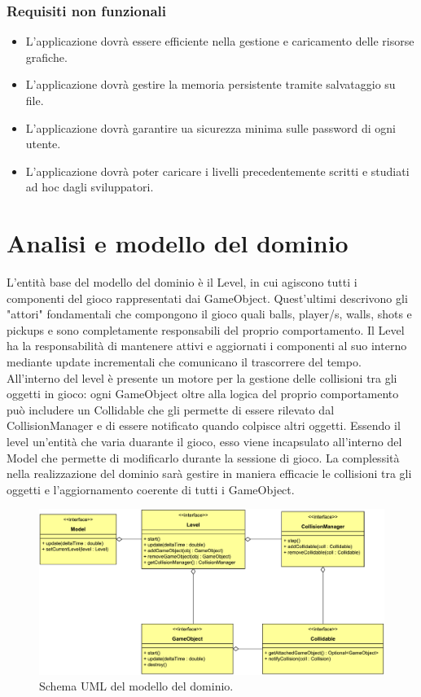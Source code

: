 \documentclass[a4paper,12pt]{report}
\begin{document}
\subsubsection{Requisiti non funzionali}
\begin{itemize}
	\item L'applicazione dovrà essere efficiente nella gestione e caricamento delle risorse grafiche.
	\item L'applicazione dovrà gestire la memoria persistente tramite salvataggio su file.
	\item L'applicazione dovrà garantire ua sicurezza minima sulle password di ogni utente.
	\item L'applicazione dovrà poter caricare i livelli precedentemente scritti e studiati ad hoc dagli sviluppatori.
\end{itemize}

\section{Analisi e modello del dominio}

L'entità base del modello del dominio è il Level, in cui agiscono tutti i componenti del gioco rappresentati dai GameObject.
Quest'ultimi descrivono gli "attori" fondamentali che compongono il gioco quali balls, player/s, walls, shots e pickups e sono completamente responsabili del proprio comportamento.
Il Level ha la responsabilità di mantenere attivi e aggiornati i componenti al suo interno mediante update incrementali che comunicano il trascorrere del tempo.
All'interno del level è presente un motore per la gestione delle collisioni tra gli oggetti in gioco: ogni GameObject oltre alla logica del proprio comportamento può includere un Collidable che gli permette di essere rilevato dal CollisionManager e di essere notificato quando colpisce altri oggetti.
Essendo il level un'entità che varia duarante il gioco, esso viene incapsulato all'interno del Model che permette di modificarlo durante la sessione di gioco.
La complessità nella realizzazione del dominio sarà gestire in maniera efficacie le collisioni tra gli oggetti e l'aggiornamento coerente di tutti i GameObject.

\begin{figure}[H]
\includegraphics[width=\linewidth]{img/model}
\caption{Schema UML del modello del dominio.}
\label{img:model}
\end{figure}
\end{document}
